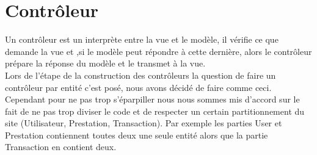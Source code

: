 

\section{Contrôleur}
Un contrôleur est un interprète entre la vue et le modèle, il vérifie ce que demande la vue et ,si le modèle peut répondre à cette dernière, alors le contrôleur prépare la réponse du modèle et le transmet à la vue.\\
Lors de l'étape de la construction des contrôleurs la question de faire un contrôleur par entité c'est posé, nous avons décidé de faire comme ceci. Cependant pour ne pas trop s'éparpiller nous nous sommes mis d'accord sur le fait de ne pas trop diviser le code et de respecter un certain partitionnement du site (Utilisateur, Prestation, Transaction). Par exemple les parties User et Prestation contiennent toutes deux une seule entité alors que la partie Transaction en contient deux.



